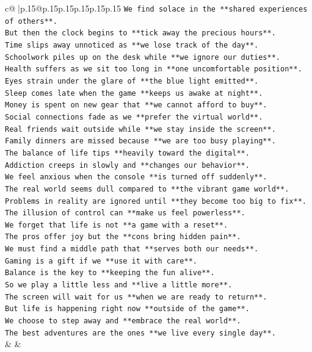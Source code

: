\documentclass{article}
\begin{document}
{\begin{supertabular}{c@{$\;$}|p{.15\linewidth}@{}p{.15\linewidth}p{.15\linewidth}p{.15\linewidth}p{.15\linewidth}p{.15\linewidth}}
{{{\texttt{We find solace in the **shared experiences of others**.} \\
\texttt{But then the clock begins to **tick away the precious hours**.} \\
\texttt{Time slips away unnoticed as **we lose track of the day**.} \\
\texttt{Schoolwork piles up on the desk while **we ignore our duties**.} \\
\texttt{Health suffers as we sit too long in **one uncomfortable position**.} \\
\texttt{Eyes strain under the glare of **the blue light emitted**.} \\
\texttt{Sleep comes late when the game **keeps us awake at night**.} \\
\texttt{Money is spent on new gear that **we cannot afford to buy**.} \\
\texttt{Social connections fade as we **prefer the virtual world**.} \\
\texttt{Real friends wait outside while **we stay inside the screen**.} \\
\texttt{Family dinners are missed because **we are too busy playing**.} \\
\texttt{The balance of life tips **heavily toward the digital**.} \\
\texttt{Addiction creeps in slowly and **changes our behavior**.} \\
\texttt{We feel anxious when the console **is turned off suddenly**.} \\
\texttt{The real world seems dull compared to **the vibrant game world**.} \\
\texttt{Problems in reality are ignored until **they become too big to fix**.} \\
\texttt{The illusion of control can **make us feel powerless**.} \\
\texttt{We forget that life is not **a game with a reset**.} \\
\texttt{The pros offer joy but the **cons bring hidden pain**.} \\
\texttt{We must find a middle path that **serves both our needs**.} \\
\texttt{Gaming is a gift if we **use it with care**.} \\
\texttt{Balance is the key to **keeping the fun alive**.} \\
\texttt{So we play a little less and **live a little more**.} \\
\texttt{The screen will wait for us **when we are ready to return**.} \\
\texttt{But life is happening right now **outside of the game**.} \\
\texttt{We choose to step away and **embrace the real world**.} \\
\texttt{The best adventures are the ones **we live every single day**.} \\
            }
        }
    }
    & & \\ \\


\end{supertabular}}
\end{document}
